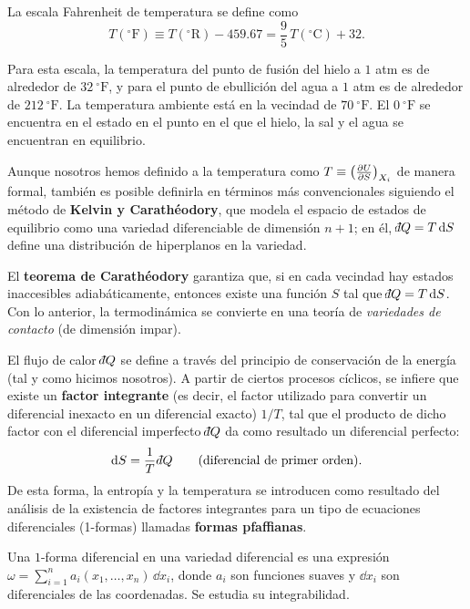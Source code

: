 \begin{definicion}
  La escala Fahrenheit de temperatura se define como
  \begin{equation*}
    T(^{\circ}\mathrm{F})\equiv T(^{\circ}\mathrm{R})-459.67=\frac{9}{5}\,T(^{\circ}\mathrm{C})+32.
  \end{equation*}
\end{definicion}

Para esta escala, la temperatura del punto de fusión del hielo a $1$ atm es de alrededor de
$32\ ^{\circ}\mathrm{F}$, y para el punto de ebullición del agua a $1$ atm es de alrededor de
$212\ ^{\circ}\mathrm{F}$. La temperatura ambiente está en la vecindad de $70\ ^{\circ}\mathrm{F}$.
El $0\ ^{\circ}\mathrm{F}$ se encuentra en el estado en el punto en el que el hielo, la sal y el
agua se encuentran en equilibrio.

Aunque nosotros hemos definido a la temperatura como $T\equiv\left(\frac{\partial U}{\partial S}\right)_{X_i}$ de manera formal,
también es posible definirla en términos más convencionales siguiendo el método de
\textbf{Kelvin y Carathéodory}, que modela el espacio de estados de equilibrio como una variedad
diferenciable de dimensión $n+1$; en él, $\dbar Q=T\,\dd S$ define una distribución de hiperplanos
en la variedad.

El \textbf{teorema de Carathéodory} garantiza que, si en cada vecindad hay estados inaccesibles
adiabáticamente, entonces existe una función $S$ tal que $\dbar Q=T\,\dd S$. Con lo anterior, la
termodinámica se convierte en una teoría de \emph{variedades de contacto} (de dimensión impar).

El flujo de calor $\dbar Q$ se define a través del principio de conservación de la energía (tal y
como hicimos nosotros). A partir de ciertos procesos cíclicos, se infiere que existe un
\textbf{factor integrante} (es decir, el factor utilizado para convertir un diferencial inexacto en
un diferencial exacto) $1/T$, tal que el producto de dicho factor con el diferencial imperfecto
$\dbar Q$ da como resultado un diferencial perfecto:
\begin{equation*}
  \dd S=\frac{1}{T}\,\dbar Q\qquad(\text{diferencial de primer orden}).
\end{equation*}
De esta forma, la entropía y la temperatura se introducen como resultado del análisis de la
existencia de factores integrantes para un tipo de ecuaciones diferenciales (1-formas) llamadas
\textbf{formas pfaffianas}.

\begin{definicion}
  Una $1$-forma diferencial en una variedad diferencial es una expresión
  $\omega=\sum_{i=1}^{n}a_i(x_1,\dots,x_n)\,\dd x_i$, donde $a_i$ son funciones suaves y $\dd x_i$
  son diferenciales de las coordenadas. Se estudia su integrabilidad.
\end{definicion}

